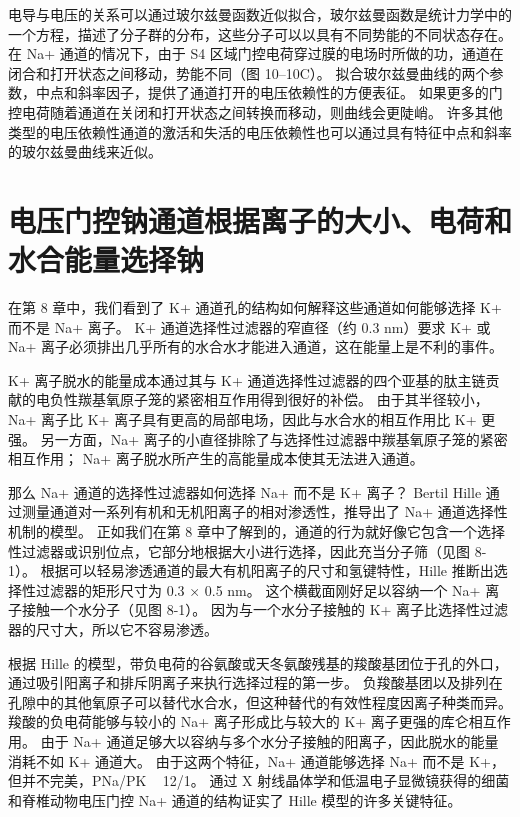 电导与电压的关系可以通过玻尔兹曼函数近似拟合，玻尔兹曼函数是统计力学中的一个方程，描述了分子群的分布，这些分子可以以具有不同势能的不同状态存在。 
在 Na+ 通道的情况下，由于 S4 区域门控电荷穿过膜的电场时所做的功，通道在闭合和打开状态之间移动，势能不同（图 10–10C）。 
拟合玻尔兹曼曲线的两个参数，中点和斜率因子，提供了通道打开的电压依赖性的方便表征。 
如果更多的门控电荷随着通道在关闭和打开状态之间转换而移动，则曲线会更陡峭。 
许多其他类型的电压依赖性通道的激活和失活的电压依赖性也可以通过具有特征中点和斜率的玻尔兹曼曲线来近似。


\section{电压门控钠通道根据离子的大小、电荷和水合能量选择钠}

在第 8 章中，我们看到了 K+ 通道孔的结构如何解释这些通道如何能够选择 K+ 而不是 Na+ 离子。 
K+ 通道选择性过滤器的窄直径（约 0.3 nm）要求 K+ 或 Na+ 离子必须排出几乎所有的水合水才能进入通道，这在能量上是不利的事件。


K+ 离子脱水的能量成本通过其与 K+ 通道选择性过滤器的四个亚基的肽主链贡献的电负性羰基氧原子笼的紧密相互作用得到很好的补偿。 
由于其半径较小，Na+ 离子比 K+ 离子具有更高的局部电场，因此与水合水的相互作用比 K+ 更强。 
另一方面，Na+ 离子的小直径排除了与选择性过滤器中羰基氧原子笼的紧密相互作用； 
Na+ 离子脱水所产生的高能量成本使其无法进入通道。


那么 Na+ 通道的选择性过滤器如何选择 Na+ 而不是 K+ 离子？ 
Bertil Hille 通过测量通道对一系列有机和无机阳离子的相对渗透性，推导出了 Na+ 通道选择性机制的模型。 
正如我们在第 8 章中了解到的，通道的行为就好像它包含一个选择性过滤器或识别位点，它部分地根据大小进行选择，因此充当分子筛（见图 8-1）。 
根据可以轻易渗透通道的最大有机阳离子的尺寸和氢键特性，Hille 推断出选择性过滤器的矩形尺寸为 0.3 × 0.5 nm。 
这个横截面刚好足以容纳一个 Na+ 离子接触一个水分子（见图 8-1）。 
因为与一个水分子接触的 K+ 离子比选择性过滤器的尺寸大，所以它不容易渗透。


根据 Hille 的模型，带负电荷的谷氨酸或天冬氨酸残基的羧酸基团位于孔的外口，通过吸引阳离子和排斥阴离子来执行选择过程的第一步。 
负羧酸基团以及排列在孔隙中的其他氧原子可以替代水合水，但这种替代的有效性程度因离子种类而异。 
羧酸的负电荷能够与较小的 Na+ 离子形成比与较大的 K+ 离子更强的库仑相互作用。 
由于 Na+ 通道足够大以容纳与多个水分子接触的阳离子，因此脱水的能量消耗不如 K+ 通道大。 
由于这两个特征，Na+ 通道能够选择 Na+ 而不是 K+，但并不完美，PNa/PK ~ 12/1。 
通过 X 射线晶体学和低温电子显微镜获得的细菌和脊椎动物电压门控 Na+ 通道的结构证实了 Hille 模型的许多关键特征。


